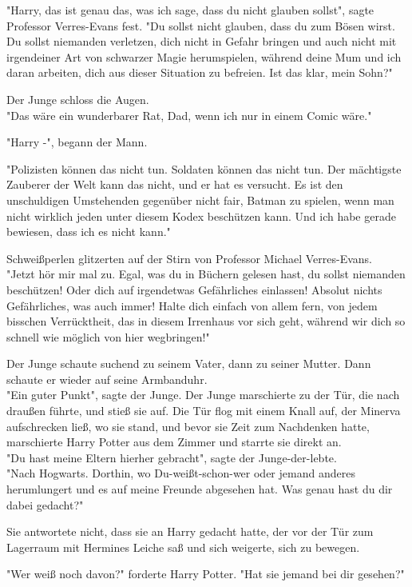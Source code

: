 {"Harry, das ist genau das, was ich sage, dass du nicht glauben sollst", sagte Professor Verres-Evans fest. "Du sollst nicht glauben, dass du zum Bösen wirst. Du sollst niemanden verletzen, dich nicht in Gefahr bringen und auch nicht mit irgendeiner Art von schwarzer Magie herumspielen, während deine Mum und ich daran arbeiten, dich aus dieser Situation zu befreien. Ist das klar, mein Sohn?"

Der Junge schloss die Augen.\\ "Das wäre ein wunderbarer Rat, Dad, wenn ich nur in einem Comic wäre."

"Harry -", begann der Mann.

"Polizisten können das nicht tun. Soldaten können das nicht tun. Der mächtigste Zauberer der Welt kann das nicht, und er hat es versucht. Es ist den unschuldigen Umstehenden gegenüber nicht fair, Batman zu spielen, wenn man nicht wirklich jeden unter diesem Kodex beschützen kann. Und ich habe gerade bewiesen, dass ich es nicht kann."

Schweißperlen glitzerten auf der Stirn von Professor Michael Verres-Evans.\\ "Jetzt hör mir mal zu. Egal, was du in Büchern gelesen hast, du sollst niemanden beschützen! Oder dich auf irgendetwas Gefährliches einlassen! Absolut nichts Gefährliches, was auch immer! Halte dich einfach von allem fern, von jedem bisschen Verrücktheit, das in diesem Irrenhaus vor sich geht, während wir dich so schnell wie möglich von hier wegbringen!"

Der Junge schaute suchend zu seinem Vater, dann zu seiner Mutter. Dann schaute er wieder auf seine Armbanduhr.\\ "Ein guter Punkt", sagte der Junge. Der Junge marschierte zu der Tür, die nach draußen führte, und stieß sie auf. Die Tür flog mit einem Knall auf, der Minerva aufschrecken ließ, wo sie stand, und bevor sie Zeit zum Nachdenken hatte, marschierte Harry Potter aus dem Zimmer und starrte sie direkt an.\\ "Du hast meine Eltern hierher gebracht", sagte der Junge-der-lebte.\\ "Nach Hogwarts. Dorthin, wo Du-weißt-schon-wer oder jemand anderes herumlungert und es auf meine Freunde abgesehen hat. Was genau hast du dir dabei gedacht?"

Sie antwortete nicht, dass sie an Harry gedacht hatte, der vor der Tür zum Lagerraum mit Hermines Leiche saß und sich weigerte, sich zu bewegen.

"Wer weiß noch davon?" forderte Harry Potter. "Hat sie jemand bei dir gesehen?"

}
